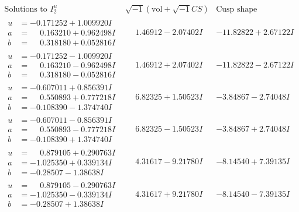 \documentclass[1p]{elsarticle_modified}
\theoremstyle{definition}
\newcommand{\I}{\sqrt{-1}}
\begin{document}
$$\begin{array}{c|c|c}  
\text{Solutions to }I^u_{2}& \I (\text{vol} + \sqrt{-1}CS) & \text{Cusp shape}\\
 \hline 
\begin{aligned}
u &= -0.171252 + 1.009920 I \\
a &= \phantom{-}0.163210 + 0.962498 I \\
b &= \phantom{-}0.318180 + 0.052816 I\end{aligned}
 & \phantom{-}1.46912 - 2.07402 I & -11.82822 + 2.67122 I \\ \hline\begin{aligned}
u &= -0.171252 - 1.009920 I \\
a &= \phantom{-}0.163210 - 0.962498 I \\
b &= \phantom{-}0.318180 - 0.052816 I\end{aligned}
 & \phantom{-}1.46912 + 2.07402 I & -11.82822 - 2.67122 I \\ \hline\begin{aligned}
u &= -0.607011 + 0.856391 I \\
a &= \phantom{-}0.550893 + 0.777218 I \\
b &= -0.108390 - 1.374740 I\end{aligned}
 & \phantom{-}6.82325 + 1.50523 I & -3.84867 - 2.74048 I \\ \hline\begin{aligned}
u &= -0.607011 - 0.856391 I \\
a &= \phantom{-}0.550893 - 0.777218 I \\
b &= -0.108390 + 1.374740 I\end{aligned}
 & \phantom{-}6.82325 - 1.50523 I & -3.84867 + 2.74048 I \\ \hline\begin{aligned}
u &= \phantom{-}0.879105 + 0.290763 I \\
a &= -1.025350 + 0.339134 I \\
b &= -0.28507 - 1.38638 I\end{aligned}
 & \phantom{-}4.31617 - 9.21780 I & -8.14540 + 7.39135 I \\ \hline\begin{aligned}
u &= \phantom{-}0.879105 - 0.290763 I \\
a &= -1.025350 - 0.339134 I \\
b &= -0.28507 + 1.38638 I\end{aligned}
 & \phantom{-}4.31617 + 9.21780 I & -8.14540 - 7.39135 I \\ \hline\begin{aligned}

\end{aligned}
\end{array}$$
\end{document}
